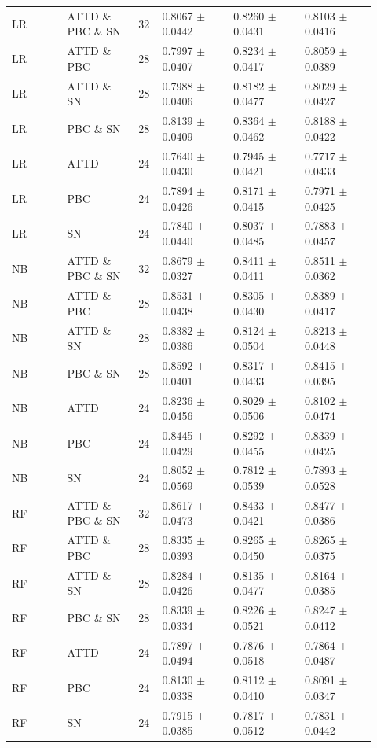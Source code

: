\documentclass[10pt,a4paper]{article}
\newcommand{\classifiersep}{\addlinespace[1pt]\midrule\addlinespace[1pt]}
\begin{document}
\begin{landscape}
\begin{longtable}{@{}L{0.14\linewidth}L{0.18\linewidth}C{0.06\linewidth}C{0.18\linewidth}C{0.18\linewidth}C{0.18\linewidth}@{}}
LR & ATTD \& PBC \& SN & 32 & 0.8067 $\pm$ 0.0442 & 0.8260 $\pm$ 0.0431 & 0.8103 $\pm$ 0.0416 \\
LR & ATTD \& PBC & 28 & 0.7997 $\pm$ 0.0407 & 0.8234 $\pm$ 0.0417 & 0.8059 $\pm$ 0.0389 \\
LR & ATTD \& SN & 28 & 0.7988 $\pm$ 0.0406 & 0.8182 $\pm$ 0.0477 & 0.8029 $\pm$ 0.0427 \\
LR & PBC \& SN & 28 & 0.8139 $\pm$ 0.0409 & 0.8364 $\pm$ 0.0462 & 0.8188 $\pm$ 0.0422 \\
LR & ATTD & 24 & 0.7640 $\pm$ 0.0430 & 0.7945 $\pm$ 0.0421 & 0.7717 $\pm$ 0.0433 \\
LR & PBC & 24 & 0.7894 $\pm$ 0.0426 & 0.8171 $\pm$ 0.0415 & 0.7971 $\pm$ 0.0425 \\
LR & SN & 24 & 0.7840 $\pm$ 0.0440 & 0.8037 $\pm$ 0.0485 & 0.7883 $\pm$ 0.0457 \\
\classifiersep
NB & ATTD \& PBC \& SN & 32 & 0.8679 $\pm$ 0.0327 & 0.8411 $\pm$ 0.0411 & 0.8511 $\pm$ 0.0362 \\
NB & ATTD \& PBC & 28 & 0.8531 $\pm$ 0.0438 & 0.8305 $\pm$ 0.0430 & 0.8389 $\pm$ 0.0417 \\
NB & ATTD \& SN & 28 & 0.8382 $\pm$ 0.0386 & 0.8124 $\pm$ 0.0504 & 0.8213 $\pm$ 0.0448 \\
NB & PBC \& SN & 28 & 0.8592 $\pm$ 0.0401 & 0.8317 $\pm$ 0.0433 & 0.8415 $\pm$ 0.0395 \\
NB & ATTD & 24 & 0.8236 $\pm$ 0.0456 & 0.8029 $\pm$ 0.0506 & 0.8102 $\pm$ 0.0474 \\
NB & PBC & 24 & 0.8445 $\pm$ 0.0429 & 0.8292 $\pm$ 0.0455 & 0.8339 $\pm$ 0.0425 \\
NB & SN & 24 & 0.8052 $\pm$ 0.0569 & 0.7812 $\pm$ 0.0539 & 0.7893 $\pm$ 0.0528 \\
\classifiersep
RF & ATTD \& PBC \& SN & 32 & 0.8617 $\pm$ 0.0473 & 0.8433 $\pm$ 0.0421 & 0.8477 $\pm$ 0.0386 \\
RF & ATTD \& PBC & 28 & 0.8335 $\pm$ 0.0393 & 0.8265 $\pm$ 0.0450 & 0.8265 $\pm$ 0.0375 \\
RF & ATTD \& SN & 28 & 0.8284 $\pm$ 0.0426 & 0.8135 $\pm$ 0.0477 & 0.8164 $\pm$ 0.0385 \\
RF & PBC \& SN & 28 & 0.8339 $\pm$ 0.0334 & 0.8226 $\pm$ 0.0521 & 0.8247 $\pm$ 0.0412 \\
RF & ATTD & 24 & 0.7897 $\pm$ 0.0494 & 0.7876 $\pm$ 0.0518 & 0.7864 $\pm$ 0.0487 \\
RF & PBC & 24 & 0.8130 $\pm$ 0.0338 & 0.8112 $\pm$ 0.0410 & 0.8091 $\pm$ 0.0347 \\
RF & SN & 24 & 0.7915 $\pm$ 0.0385 & 0.7817 $\pm$ 0.0512 & 0.7831 $\pm$ 0.0442 \\

\end{longtable}
\end{landscape}
\end{document}
